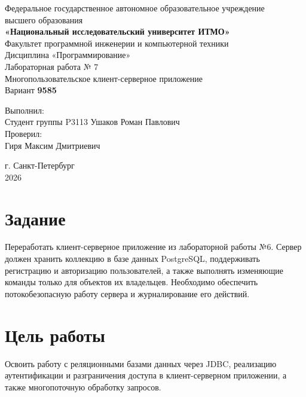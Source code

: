 \documentclass[a4paper,14pt]{extarticle}
\begin{document}
\begin{titlepage}
\begin{center}
Федеральное государственное автономное образовательное учреждение\\
высшего образования\\
\textbf{«Национальный исследовательский университет ИТМО»}\\[10mm]

Факультет программной инженерии и компьютерной техники\\
Дисциплина «Программирование»\\[34mm]

{\large Лабораторная работа № 7}\\[4mm]
Многопользовательское клиент-серверное приложение\\
Вариант \textbf{9585}
\end{center}

\vfill
\begin{flushright}
Выполнил:\\
Студент группы P3113
Ушаков Роман Павлович\\[5mm]
Проверил:\\
Гиря Максим Дмитриевич

\end{flushright}

\vfill
\begin{center}
г. Санкт-Петербург\\ 2026
\end{center}
\end{titlepage}

\setcounter{page}{2}
\tableofcontents
\newpage

\section{Задание}

Переработать клиент-серверное приложение из лабораторной работы №6. Сервер должен хранить коллекцию в базе данных PostgreSQL, поддерживать регистрацию и авторизацию пользователей, а также выполнять изменяющие команды только для объектов их владельцев. Необходимо обеспечить потокобезопасную работу сервера и журналирование его действий.

\section{Цель работы}

Освоить работу с реляционными базами данных через JDBC, реализацию аутентификации и разграничения доступа в клиент-серверном приложении, а также многопоточную обработку запросов.
\end{document}
